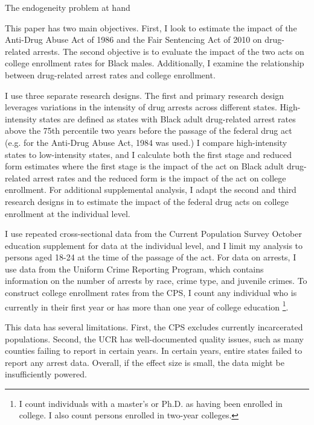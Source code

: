 \documentclass{article}
\begin{document}

The endogeneity problem at hand 


This paper has two main objectives. First, I look to estimate the impact of the Anti-Drug Abuse Act of 1986 and the Fair Sentencing Act of 2010 on drug-related arrests. The second objective is to evaluate the impact of the two acts on college enrollment rates for Black males. Additionally, I examine the relationship between drug-related arrest rates and college enrollment. 


I use three separate research designs. The first and primary research design leverages variations in the intensity of drug arrests across different states. High-intensity states are defined as states with Black adult drug-related arrest rates above the 75th percentile two years before the passage of the federal drug act (e.g. for the Anti-Drug Abuse Act, 1984 was used.) I compare high-intensity states to low-intensity states, and I calculate both the first stage and reduced form estimates where the first stage is the impact of the act on Black adult drug-related arrest rates and the reduced form is the impact of the act on college enrollment. For additional supplemental analysis, I adapt the second and third research designs in \cite{britton2022} to estimate the impact of the federal drug acts on college enrollment at the individual level.


I use repeated cross-sectional data from the Current Population Survey October education supplement for data at the individual level, and I limit my analysis to persons aged 18-24 at the time of the passage of the act. For data on arrests, I use data from the Uniform Crime Reporting Program, which contains information on the number of arrests by race, crime type, and juvenile crimes. To construct college enrollment rates from the CPS, I count any individual who is currently in their first year or has more than one year of college education \footnote{I count individuals with a master's or Ph.D. as having been enrolled in college. I also count persons enrolled in two-year colleges.}.

This data has several limitations. First, the CPS excludes currently incarcerated populations. Second, the UCR has well-documented quality issues, such as many counties failing to report in certain years. In certain years, entire states failed to report any arrest data. Overall, if the effect size is small, the data might be insufficiently powered.
\end{document}
